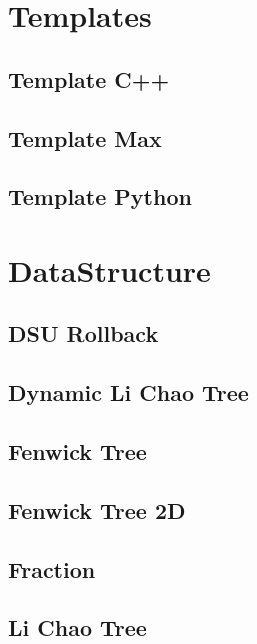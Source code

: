 \section{Templates}
\subsection{Template C++}
\raggedbottom
\hrulefill
\subsection{Template Max}
\raggedbottom
\hrulefill
\subsection{Template Python}
\raggedbottom
\hrulefill
\newpage

\section{DataStructure}
\subsection{DSU Rollback}
\raggedbottom
\hrulefill
\subsection{Dynamic Li Chao Tree}
\raggedbottom
\hrulefill
\subsection{Fenwick Tree}
\raggedbottom
\hrulefill
\subsection{Fenwick Tree 2D}
\raggedbottom
\hrulefill
\subsection{Fraction}
\raggedbottom
\hrulefill
\subsection{Li Chao Tree}
\raggedbottom
\hrulefill
